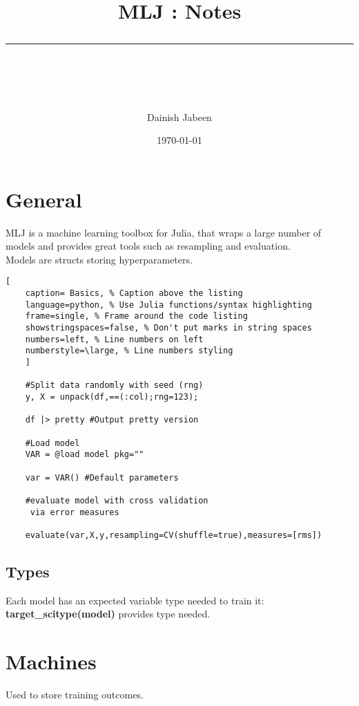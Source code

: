 \documentclass[11pt]{scrartcl} %
\title{	
	\normalfont\normalsize
	\vspace{20pt} %
	{\huge MLJ : Notes}\\ %
	\vspace{12pt} %
	\rule{\linewidth}{2pt}\\ %
}
\author{\small Dainish Jabeen} %
\date{\normalsize\today} %
\begin{document}
\maketitle %

\section{General}

MLJ is a machine learning toolbox for Julia, that wraps a large number of models and provides
great tools such as resampling and evaluation.\\

Models are structs storing hyperparameters.

\begin{lstlisting}[
	caption= Basics, % Caption above the listing
	language=python, % Use Julia functions/syntax highlighting
	frame=single, % Frame around the code listing
	showstringspaces=false, % Don't put marks in string spaces
	numbers=left, % Line numbers on left
	numberstyle=\large, % Line numbers styling
	]

	#Split data randomly with seed (rng)
	y, X = unpack(df,==(:col);rng=123); 

	df |> pretty #Output pretty version

	#Load model
	VAR = @load model pkg=""

	var = VAR() #Default parameters

	#evaluate model with cross validation
	 via error measures

	evaluate(var,X,y,resampling=CV(shuffle=true),measures=[rms])
\end{lstlisting}

\subsection{Types}

Each model has an expected variable type needed to train it:\\

\textbf{target\_scitype(model)} provides type needed.

\newpage

\section{Machines}

Used to store training outcomes.
\end{document}
